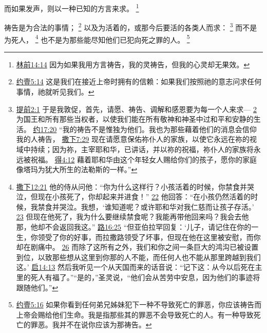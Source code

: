 \documentclass[12pt, a4paper, oneside]{ctexart}
\newcounter{parnum}[section]
\newcommand{\N}{%
   \noindent\refstepcounter{parnum}%
    \makebox[\parindent][l]{\textbf{\arabic{parnum}.}}}
\begin{document}
	而如果发声，则以一种已知的方言来求。
	\footnote {
		\href{https://biblehub.com/1_corinthians/14-14.htm}{林前14:14} 因为如果我用方言祷告，我的灵祷告，但我的心灵却无果效。
	}

\N 祷告是为合法的事情；
	\footnote {
		\href{https://biblehub.com/1_john/5-14.htm}{约壹5:14} 这是我们在接近上帝时拥有的信赖：如果我们按照祂的意志问求任何事情，祂就听见我们。
	}
	以及为活着的，或那今后要活的各类人而求：
	\footnote {
		\href{https://biblehub.com/1_timothy/2-1.htm}{提前2:1} 于是我敦促，首先，请愿、祷告、调解和感恩要为每一个人来求---
		\href{https://biblehub.com/1_timothy/2-2.htm}{2} 为国王和所有那些当权者，以使我们能在所有敬神和神圣中过和平和安静的生活。
		\href{https://biblehub.com/john/17-20.htm}{约17:20} “我的祷告不是惟独为他们。我也为那些藉着他们的消息会信仰我的人祷告，
		\href{https://biblehub.com/2_samuel/7-29.htm}{撒下7:29} 现在请愿意保佑祢仆人的家族，以使它永远在祢的视域中持续；因为祢，主宰耶和华，已讲话，并以祢的祝福，祢仆人的家族将永远被祝福。
		\href{https://biblehub.com/ruth/4-12.htm}{得4:12} 藉着耶和华由这个年轻女人赐给你们的孩子，愿你的家庭像塔玛为犹大所生的法勒斯的一样。”
	}
	而不是为死人，
	\footnote {
		\href{https://biblehub.com/2_samuel/12-21.htm}{撒下12:21} 他的侍从问他：“你为什么这样行？小孩活着的时候，你禁食并哭泣，但现在小孩死了，你却起来并进食！”
		\href{https://biblehub.com/2_samuel/12-22.htm}{22} 他回答：“在小孩仍然活着的时候，我禁食并哭泣。我想，‘谁知道呢？或许耶和华对我仁慈而让孩子存活。’
		\href{https://biblehub.com/2_samuel/12-23.htm}{23} 但现在他死了，我为什么要继续禁食呢？我能再带他回来吗？我会去他那，他却不会返回我这。”
		\href{https://biblehub.com/luke/16-25.htm}{路16:25} “但亚伯拉罕回复：‘儿子，请记住在你的一生，你领受了你的好事，而拉撒路领受了坏事，但现在他在这里被安慰，而你却在剧痛中。
		\href{https://biblehub.com/luke/16-26.htm}{26} 而除了这所有之外，我们和你之间一条巨大的鸿沟已被设置到位，以致那些想从这里到你那的人不能，而任何人也不能从那里跨越到我们这。’
		\href{https://biblehub.com/revelation/14-13.htm}{启14:13} 然后我听见一个从天国而来的话音说：“记下这：从今以后死在主里的死人有福了。”“是的，”圣灵说，“他们会从苦劳中安息，因为他们的事迹将跟随他们。”
	}
	也不是为那些能尽知他们已犯向死之罪的人。
	\footnote {
		\href{https://biblehub.com/1_john/5-16.htm}{约壹5:16} 如果你看到任何弟兄姊妹犯下一种不导致死亡的罪恶，你应该祷告而上帝会赐给他们生命。我是指那些其的罪恶不会导致死亡的人。有一种导致死亡的罪恶。我并不在说你应该为那祷告。
	}
\end{document}
